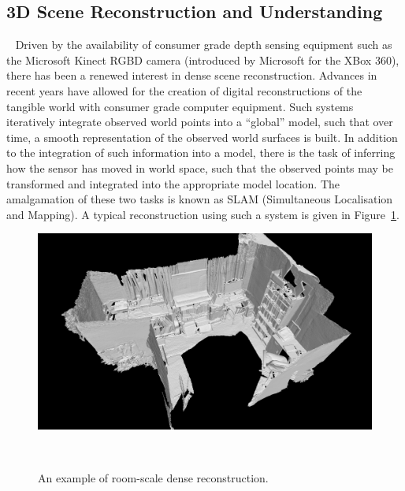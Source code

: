 \subsection{3D Scene Reconstruction and Understanding}
~\label{subsec:intro_scene_recon}
Driven by the availability of consumer grade depth sensing equipment such as the Microsoft Kinect RGBD camera 
(introduced by Microsoft for the XBox 360), there has been a renewed interest in dense scene reconstruction. 
Advances in recent years have allowed for the creation of digital reconstructions of the tangible world with 
consumer grade computer equipment. Such systems iteratively integrate observed world points into a ``global'' 
model, such that over time, a smooth representation of the observed world surfaces is built. In addition to the 
integration of such information into a model, there is the task of inferring how the sensor has moved in world 
space, such that the observed points may be transformed and integrated into the appropriate model location. The 
amalgamation of these two tasks is known as SLAM (Simultaneous Localisation and Mapping). A typical 
reconstruction using such a system is given in Figure~\ref{figure:room_recon_example}.
\begin{figure}[!htbp]
  \centering
  \includegraphics[width=.9\linewidth]{figures/intro/room_scene.png}
  \caption[Room Scale Dense Reconstruction]{An example of room-scale dense reconstruction.}
~\label{figure:room_recon_example}
\end{figure}

